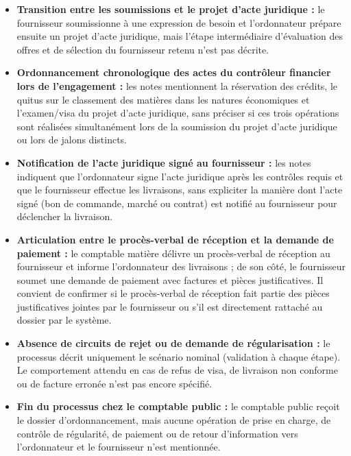 \begin{itemize}
  \item \textbf{Transition entre les soumissions et le projet d'acte juridique :} le fournisseur soumissionne à une expression de besoin et l'ordonnateur prépare ensuite un projet d'acte juridique, mais l'étape intermédiaire d'évaluation des offres et de sélection du fournisseur retenu n'est pas décrite.
  \item \textbf{Ordonnancement chronologique des actes du contrôleur financier lors de l'engagement :} les notes mentionnent la réservation des crédits, le quitus sur le classement des matières dans les natures économiques et l'examen/visa du projet d'acte juridique, sans préciser si ces trois opérations sont réalisées simultanément lors de la soumission du projet d'acte juridique ou lors de jalons distincts.
  \item \textbf{Notification de l'acte juridique signé au fournisseur :} les notes indiquent que l'ordonnateur signe l'acte juridique après les contrôles requis et que le fournisseur effectue les livraisons, sans expliciter la manière dont l'acte signé (bon de commande, marché ou contrat) est notifié au fournisseur pour déclencher la livraison.
  \item \textbf{Articulation entre le procès-verbal de réception et la demande de paiement :} le comptable matière délivre un procès-verbal de réception au fournisseur et informe l'ordonnateur des livraisons ; de son côté, le fournisseur soumet une demande de paiement avec factures et pièces justificatives. Il convient de confirmer si le procès-verbal de réception fait partie des pièces justificatives jointes par le fournisseur ou s'il est directement rattaché au dossier par le système.
  \item \textbf{Absence de circuits de rejet ou de demande de régularisation :} le processus décrit uniquement le scénario nominal (validation à chaque étape). Le comportement attendu en cas de refus de visa, de livraison non conforme ou de facture erronée n'est pas encore spécifié.
  \item \textbf{Fin du processus chez le comptable public :} le comptable public reçoit le dossier d'ordonnancement, mais aucune opération de prise en charge, de contrôle de régularité, de paiement ou de retour d'information vers l'ordonnateur et le fournisseur n'est mentionnée.
\end{itemize}
